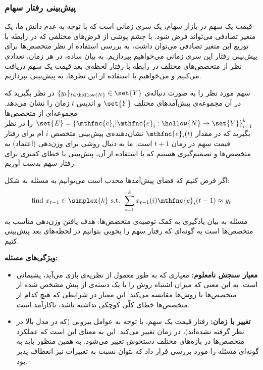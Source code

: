 \subsubsection{
پیش‌بینی رفتار سهام
}


قیمت یک سهم در بازار سهام، یک سری زمانی است که با توجه به عدم دانش ما، یک متغیر تصادفی می‌تواند فرض شود. با چشم پوشی از فرض‌های مختلفی که در رابطه با توزیع این متغیر تصادفی می‌توان داشت، به بررسی استفاده از نظر متخصص‌ها برای پیش‌بینی رفتار این سری زمانی می‌خواهیم بپردازیم. به بیان ساده، در هر زمان، تعدادی نظر از متخصص‌های مختلف در رابطه با رفتار لحظه‌ی بعد قیمت یک سهم دریافت می‌کنیم و می‌خواهیم با استفاده از این نظرها، به پیش‌بینی بپردازیم.

سهم مورد نظر را به صورت دنباله‌ی
$\{ y_t \}_{t \in \hollow{N}} \in \set{Y}$
در نظر بگیرید که در آن مجموعه‌ی پیش‌آمدهای مختلف
$\set{Y}$
و اندیس
$t$
زمان را نشان می‌دهد. مجموعه‌ای از متخصص‌ها
$\set{E} = \left\lbrace \mthfnc{e}_i \vert \mthfnc{e}_i: \hollow{N} \rightarrow \set{Y} \right\rbrace^{k}_{i=1}$
را در نظر بگیرید که در مقدار
$\mthfnc{e}_i(t)$
نشان‌دهنده‌ی پیش‌بینی متخصص
$i$
ام برای رفتار قیمت سهم در زمان
$t+1$
است. ما به دنبال روشی برای وزن‌دهی (اعتماد) به متخصص‌ها و تصمیم‌گیری هستیم که با استفاده از آن، پیش‌بینی با خطای کمتری برای رفتار سهم بدست آوریم.

اگر فرض کنیم که فضای پیش‌آمدها محدب است می‌توانیم به مسئله به شکل:
\[
\mbox{find } x_{t-1} \in \simplex{k} \mbox{ s.t. } \sum^{k}_{i=1} x_{t-1}(i) \mthfnc{e}_i(t-1) \approx y_t
\]
مسئله به بیان یادگیری به کمک توصیه‌ی متخصص‌ها: هدف یافتن وزن‌دهی مناسب به متخصص‌ها است به گونه‌ای که رفتار سهم را بخوبی بتوانیم در لحظه‌های بعد پیش‌بینی کنیم.

\textbf{
ویژگی‌های مسئله:
}
\begin{itemize}
\item\textbf{
معیار سنجش نامعلوم:
}
معیاری که به طور معمول از نظریه‌ی بازی
می‌آید، پشیمانی
است. به این معنی که میزان اشتباه روش را با یک دسته‌ی از پیش مشخص شده از متخصص‌ها یا روش‌ها مقایسه می‌کند. ابن معیار در شرایطی که هیچ کدام از متخصص‌ها خطای کلّی کوچکی نداشته باشد، ناکارآمد است.
\item\textbf{
تغییر با زمان:
}
رفتار قیمت یک سهم، با توجه به عوامل بیرونی (که در مدل بالا در نظر گرفته نشده‌اند)، در زمان تغییر می‌کند. این به معنای این است که عملکرد متخصص‌ها در بازه‌های مختلف دستخوش تغییر می‌شود. به همین منظور باید به گونه‌ای مسئله را مورد بررسی قرار داد که بتوان نسبت به تغییرات نیز انعطاف پدیر بود.
\end{itemize}




